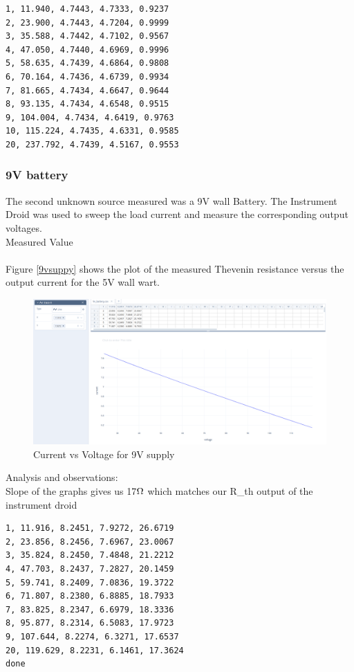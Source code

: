 \documentclass[a4paper,11pt]{article}%
\begin{document}
\begin{lstlisting}
1, 11.940, 4.7443, 4.7333, 0.9237
2, 23.900, 4.7443, 4.7204, 0.9999 
3, 35.588, 4.7442, 4.7102, 0.9567
4, 47.050, 4.7440, 4.6969, 0.9996
5, 58.635, 4.7439, 4.6864, 0.9808
6, 70.164, 4.7436, 4.6739, 0.9934
7, 81.665, 4.7434, 4.6647, 0.9644
8, 93.135, 4.7434, 4.6548, 0.9515
9, 104.004, 4.7434, 4.6419, 0.9763
10, 115.224, 4.7435, 4.6331, 0.9585
20, 237.792, 4.7439, 4.5167, 0.9553
\end{lstlisting}

\subsubsection{9V battery} 


The second unknown source measured was a 9V wall Battery. The Instrument Droid was used to sweep the load current and measure the corresponding output voltages.\\

Measured Value\\
 \\
Figure \ref{9vsuppy} shows the plot of the measured Thevenin resistance versus the output current for the 5V wall wart.\\


\begin{figure}[H]
	\centering
	\includegraphics[scale=0.30]{figures/9v.png}
  \caption{Current vs Voltage for 9V supply}
  \label{fig:9vsuppy}
\end{figure}

Analysis and observations:\\
Slope of the graphs gives us 17$\ohm$  which matches our R\_th output of the instrument droid


\begin{lstlisting}
1, 11.916, 8.2451, 7.9272, 26.6719 
2, 23.856, 8.2456, 7.6967, 23.0067 
3, 35.824, 8.2450, 7.4848, 21.2212 
4, 47.703, 8.2437, 7.2827, 20.1459 
5, 59.741, 8.2409, 7.0836, 19.3722 
6, 71.807, 8.2380, 6.8885, 18.7933 
7, 83.825, 8.2347, 6.6979, 18.3336 
8, 95.877, 8.2314, 6.5083, 17.9723 
9, 107.644, 8.2274, 6.3271, 17.6537 
20, 119.629, 8.2231, 6.1461, 17.3624 
done
\end{lstlisting}
\end{document}
